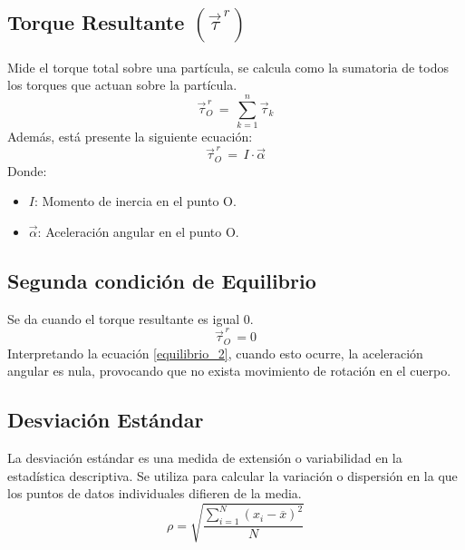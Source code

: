 \documentclass[../main]{subfiles}
\begin{document}
\subsection{Torque Resultante $(\vec{\tau}^{\,r})$}
Mide el torque total sobre una partícula, se calcula como la 
sumatoria de todos los torques que actuan sobre la partícula.
\begin{equation} \label{torque_resultante1}
    \vec{\tau}_O^{\,r} \, = \, \sum^n_{k=1} \vec{\tau}_k
\end{equation}
Además, está presente la siguiente ecuación:
\begin{equation} \label{torque_resultante2}
    \vec{\tau}_O^{\,r} \, = \, I \cdot  \vec{\alpha}
\end{equation}
Donde:
\begin{itemize}
    \item $I$: Momento de inercia en el punto O.
    \item $\vec{\alpha}$: Aceleración angular en el punto O.
\end{itemize}

\subsection{Segunda condición de Equilibrio}
Se da cuando el torque resultante es igual 0.
\begin{equation} \label{equilibrio_2}
    \vec{\tau}_O^{\,r} \, = 0
\end{equation}
Interpretando la ecuación \ref{equilibrio_2}, cuando esto ocurre, la aceleración 
angular es nula, provocando que no exista movimiento de rotación en el cuerpo.


\subsection{Desviación Estándar}
La desviación estándar es una medida de extensión o 
variabilidad en la estadística descriptiva. 
Se utiliza para calcular la variación o dispersión
en la que los puntos de datos individuales difieren 
de la media. 
\begin{equation} \label{desviacion_eq}
    \rho = \sqrt{\frac{\sum^N_{i=1} (x_i - \overline{x})^2}{N}}
\end{equation}
\end{document}
